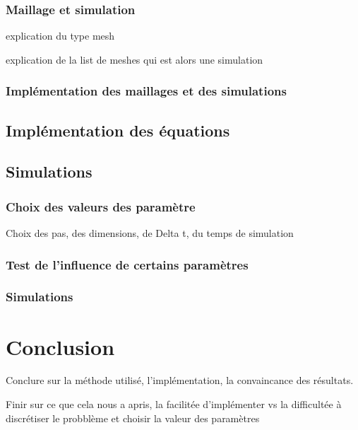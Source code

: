 \documentclass[fleqn]{article}
\begin{document}
\subsubsection{Maillage et simulation}
explication du type mesh

explication de la list de meshes qui est alors une simulation
\subsubsection{Implémentation des maillages et des simulations}
\subsection{Implémentation des équations}
\subsection{Simulations}
\subsubsection{Choix des valeurs des paramètre}
Choix des pas, des dimensions, de Delta t, du temps de simulation
\subsubsection{Test de l'influence de certains paramètres}
\subsubsection{Simulations}

\newpage
\section{Conclusion}
Conclure sur la méthode utilisé, l'implémentation, la convaincance des résultats.

Finir sur ce que cela nous a apris, la facilitée d'implémenter vs la difficultée à discrétiser le probblème et choisir la valeur des paramètres
\end{document}
